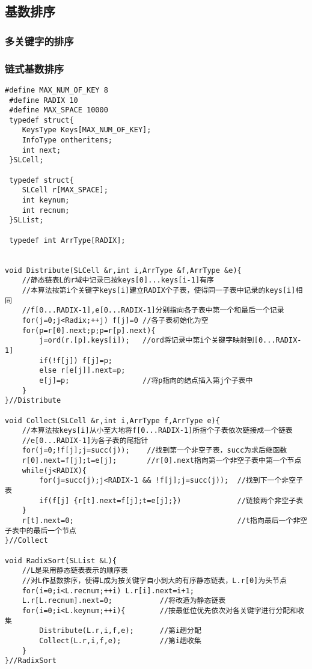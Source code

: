\documentclass[UTF8]{ctexart}
\begin{document}
\subsection{基数排序}

\subsubsection{多关键字的排序}

\subsubsection{链式基数排序}
 
\begin{lstlisting}[style=v1]
 #define MAX_NUM_OF_KEY 8
 #define RADIX 10
 #define MAX_SPACE 10000
 typedef struct{
    KeysType Keys[MAX_NUM_OF_KEY];
    InfoType ontheritems;
    int next;
 }SLCell;

 typedef struct{
    SLCell r[MAX_SPACE];
    int keynum;
    int recnum;
 }SLList;

 typedef int ArrType[RADIX];


void Distribute(SLCell &r,int i,ArrType &f,ArrType &e){
    //静态链表L的r域中记录已按keys[0]...keys[i-1]有序
    //本算法按第i个关键字keys[i]建立RADIX个子表，使得同一子表中记录的keys[i]相同
    //f[0...RADIX-1],e[0...RADIX-1]分别指向各子表中第一个和最后一个记录
    for(j=0;j<Radix;++j) f[j]=0 //各子表初始化为空
    for(p=r[0].next;p;p=r[p].next){
        j=ord(r.[p].keys[i]);   //ord将记录中第i个关键字映射到[0...RADIX-1]
        if(!f[j]) f[j]=p;
        else r[e[j]].next=p;
        e[j]=p;                 //将p指向的结点插入第j个子表中
    }
}//Distribute

void Collect(SLCell &r,int i,ArrType f,ArrType e){
    //本算法按keys[i]从小至大地将f[0...RADIX-1]所指个子表依次链接成一个链表
    //e[0...RADIX-1]为各子表的尾指针
    for(j=0;!f[j];j=succ(j));    //找到第一个非空子表，succ为求后继函数
    r[0].next=f[j];t=e[j];       //r[0].next指向第一个非空子表中第一个节点
    while(j<RADIX){
        for(j=succ(j);j<RADIX-1 && !f[j];j=succ(j));  //找到下一个非空子表
        if(f[j] {r[t].next=f[j];t=e[j];})             //链接两个非空子表 
    }                   
    r[t].next=0;                                      //t指向最后一个非空子表中的最后一个节点 
}//Collect

void RadixSort(SLList &L){
    //L是采用静态链表表示的顺序表
    //对L作基数排序，使得L成为按关键字自小到大的有序静态链表，L.r[0]为头节点
    for(i=0;i<L.recnum;++i) L.r[i].next=i+1;
    L.r[L.recnum].next=0;           //将改造为静态链表
    for(i=0;i<L.keynum;++i){        //按最低位优先依次对各关键字进行分配和收集   
        Distribute(L.r,i,f,e);      //第i趟分配
        Collect(L.r,i,f,e);         //第i趟收集
    }
}//RadixSort


\end{lstlisting}
\end{document}
